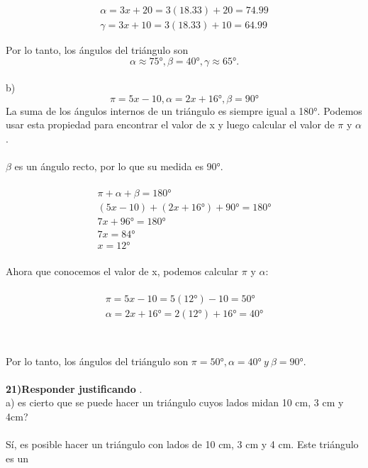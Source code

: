\documentclass{article}
\begin{document}
\begin{equation}
\begin{array}{l}
\alpha = 3x + 20 = 3(18.33) + 20 = 74.99 \\
\gamma = 3x + 10 = 3(18.33) + 10 = 64.99
\end{array}
\end{equation}

Por lo tanto, los ángulos del triángulo son 
\[
\alpha \approx 75°, \beta = 40° , \gamma \approx 65°.
\]
\\
b)  
\[
\pi = 5x-10 ,  \alpha = 2x+16°, \beta=90°
\]
La suma de los ángulos internos de un triángulo es siempre igual a 180°. Podemos usar esta propiedad para encontrar el valor de x y luego calcular el valor de $\pi$ y $\alpha$.\\
\\
$\beta$ es un ángulo recto, por lo que su medida es 90°.\\
\\
\begin{equation}
\begin{array}{l}
\pi + \alpha + \beta = 180°\\
(5x - 10) + (2x + 16°) + 90° = 180°\\
7x + 96° = 180°\\
7x = 84°\\
x = 12°
\end{array}
\end{equation}
\\
Ahora que conocemos el valor de x, podemos calcular $\pi$ y $\alpha$:\\
\\
\begin{equation}
\begin{array}{l}
\pi = 5x - 10 = 5(12°) - 10 = 50°\\
\alpha = 2x + 16° = 2(12°) + 16° = 40°\\
\end{array}
\end{equation}
\\
\\
Por lo tanto, los ángulos del triángulo son $\pi = 50°, \alpha = 40°\ y\ \beta = 90°$.\\
\\
{\bf 21)Responder justificando }.\\
a) es cierto que se puede hacer un triángulo cuyos lados midan 10 cm, 3 cm y 4cm?\\
\\
Sí, es posible hacer un triángulo con lados de 10 cm, 3 cm y 4 cm. Este triángulo es un\\
\end{document}
